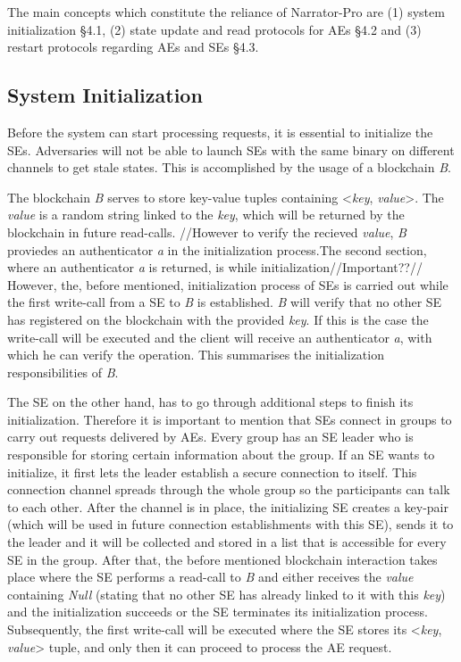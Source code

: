The main concepts which constitute the reliance of Narrator-Pro are (1) system initialization §4.1, (2) state update and read protocols for AEs §4.2 and (3) restart protocols regarding AEs and SEs §4.3.

\subsection{System Initialization}

Before the system can start processing requests, it is essential to initialize the SEs. Adversaries will not be able to launch SEs with the same binary on different channels to get stale states. This is accomplished by the usage of a blockchain \textit{B}. 

The blockchain \textit{B} serves to store key-value tuples containing <\textit{key}, \textit{value}>. The \textit{value} is a random string linked to the \textit{key}, which will be returned by the blockchain in future read-calls. 
//However to verify the recieved \textit{value}, \textit{B} proviedes an authenticator \textit{a} in the initialization process.The second section, where an authenticator \textit{a} is returned, is while initialization//Important??// 
However, the, before mentioned, initialization process of SEs is carried out while the first write-call from a SE to \textit{B} is established. \textit{B} will verify that no other SE has registered on the blockchain with the provided \textit{key}. If this is the case the write-call will be executed and the client will receive an authenticator \textit{a}, with which he can verify the operation. This summarises the initialization responsibilities of \textit{B}.

The SE on the other hand, has to go through additional steps to finish its initialization. Therefore it is important to mention that SEs connect in groups to carry out requests delivered by AEs. Every group has an SE leader who is responsible for storing certain information about the group. If an SE wants to initialize, it first lets the leader establish a secure connection to itself. This connection channel spreads through the whole group so the participants can talk to each other. After the channel is in place, the initializing SE creates a key-pair (which will be used in future connection establishments with this SE), sends it to the leader and it will be collected and stored in a list that is accessible for every SE in the group. After that, the before mentioned blockchain interaction takes place where the SE performs a read-call to \textit{B} and either receives the \textit{value} containing \textit{Null} (stating that no other SE has already linked to it with this \textit{key}) and the initialization succeeds or the SE terminates its initialization process. Subsequently, the first write-call will be executed where the SE stores its <\textit{key}, \textit{value}> tuple, and only then it can proceed to process the AE request.

